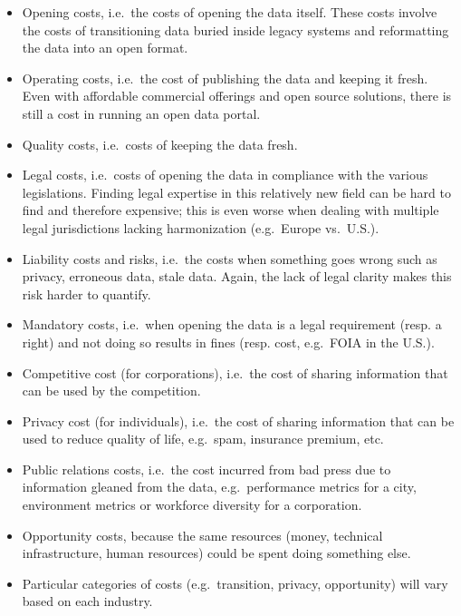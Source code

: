 \documentclass[]{acm_proc_article-sp}
\begin{document}
\begin{itemize}
\item
  Opening costs, i.e.~the costs of opening the data itself. These costs
  involve the costs of transitioning data buried inside legacy systems
  and reformatting the data into an open format.
\item
  Operating costs, i.e.~the cost of publishing the data and keeping it
  fresh. Even with affordable commercial offerings and open source
  solutions, there is still a cost in running an open data portal.
\item
  Quality costs, i.e.~costs of keeping the data fresh.
\item
  Legal costs, i.e.~costs of opening the data in compliance with the
  various legislations. Finding legal expertise in this relatively new
  field can be hard to find and therefore expensive; this is even worse
  when dealing with multiple legal jurisdictions lacking harmonization
  (e.g.~Europe vs.~U.S.).
\item
  Liability costs and risks, i.e.~the costs when something goes wrong
  such as privacy, erroneous data, stale data. Again, the lack of legal
  clarity makes this risk harder to quantify.
\item
  Mandatory costs, i.e.~when opening the data is a legal requirement
  (resp. a right) and not doing so results in fines (resp. cost,
  e.g.~FOIA in the U.S.).
\item
  Competitive cost (for corporations), i.e.~the cost of sharing
  information that can be used by the competition.
\item
  Privacy cost (for individuals), i.e.~the cost of sharing information
  that can be used to reduce quality of life, e.g.~spam, insurance
  premium, etc.
\item
  Public relations costs, i.e.~the cost incurred from bad press due to
  information gleaned from the data, e.g.~performance metrics for a
  city, environment metrics or workforce diversity for a corporation.
\item
  Opportunity costs, because the same resources (money, technical
  infrastructure, human resources) could be spent doing something else.
\item
  Particular categories of costs (e.g.~transition, privacy, opportunity)
  will vary based on each industry.
\end{itemize}
\end{document}

